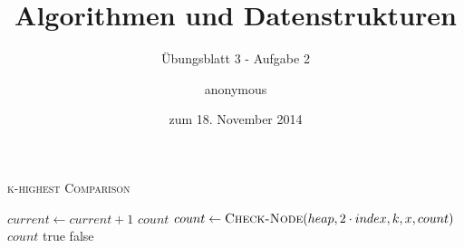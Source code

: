 \documentclass[a4paper]{scrartcl}
\title{Algorithmen und Datenstrukturen}
\subtitle{Übungsblatt 3 - Aufgabe 2}
\author{
    anonymous
}
\date{zum 18. November 2014}
\begin{document}
\maketitle


\begin{algorithm}
    \caption{\textsc{k-highest Comparison}}
    \begin{algorithmic}[1]
            \State $current \gets current + 1$
                \State \Return $count$
            \EndIf
            \State $count \gets \Call{Check-Node}{heap, 2 \cdot index, k, x, count}$
                \State \Return $count$
            \EndIf
            \State \Return {}
        \EndIf
        \EndProcedure
            \State \Return true
        \Else
            \State \Return false
        \EndIf
        \EndProcedure
    \end{algorithmic}
\end{algorithm}
\end{document}
